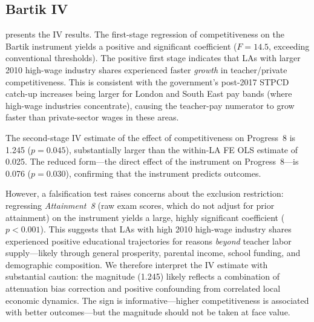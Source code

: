 \documentclass[12pt]{article}
\begin{document}
\subsection{Bartik IV}

 presents the IV results. The first-stage regression of competitiveness on the Bartik instrument yields a positive and significant coefficient ($F = 14.5$, exceeding conventional thresholds). The positive first stage indicates that LAs with larger 2010 high-wage industry shares experienced faster \textit{growth} in teacher/private competitiveness. This is consistent with the government's post-2017 STPCD catch-up increases being larger for London and South East pay bands (where high-wage industries concentrate), causing the teacher-pay numerator to grow faster than private-sector wages in these areas.

The second-stage IV estimate of the effect of competitiveness on Progress~8 is 1.245 ($p = 0.045$), substantially larger than the within-LA FE OLS estimate of 0.025. The reduced form---the direct effect of the instrument on Progress~8---is 0.076 ($p = 0.030$), confirming that the instrument predicts outcomes.

However, a falsification test raises concerns about the exclusion restriction: regressing \textit{Attainment~8} (raw exam scores, which do not adjust for prior attainment) on the instrument yields a large, highly significant coefficient ($p < 0.001$). This suggests that LAs with high 2010 high-wage industry shares experienced positive educational trajectories for reasons \textit{beyond} teacher labor supply---likely through general prosperity, parental income, school funding, and demographic composition. We therefore interpret the IV estimate with substantial caution: the magnitude (1.245) likely reflects a combination of attenuation bias correction and positive confounding from correlated local economic dynamics. The sign is informative---higher competitiveness is associated with better outcomes---but the magnitude should not be taken at face value.
\end{document}
